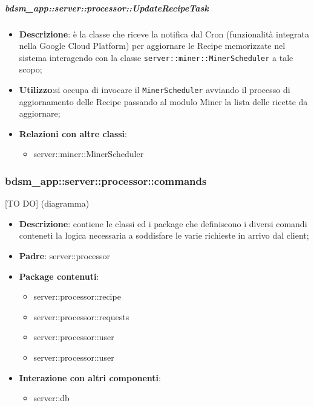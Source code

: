     \subparagraph{bdsm\_app::server::processor::UpdateRecipeTask} %
    \label{subp:bdsm_app_server_processor_updaterecipetask}
    \begin{itemize}
      \item \textbf{Descrizione}: è la classe che riceve la notifica dal Cron (funzionalità integrata nella Google Cloud Platform) per aggiornare le Recipe memorizzate nel sistema interagendo con la classe \texttt{server::miner::MinerScheduler} a tale scopo;
      \item \textbf{Utilizzo}:si occupa di invocare il \texttt{MinerScheduler} avviando il processo di aggiornamento delle Recipe passando al modulo Miner la lista delle ricette da aggiornare;
      \item \textbf{Relazioni con altre classi}:
        \begin{itemize}
          \item server::miner::MinerScheduler
        \end{itemize}
    \end{itemize}


    \subsubsection{bdsm\_app::server::processor::commands} %
    \label{ssub:bdsm_app_server_processor_commands}
    [TO DO] (diagramma) \newline \newline

    \begin{itemize}
      \item \textbf{Descrizione}: contiene le classi ed i package che definiscono i diversi comandi conteneti la logica necessaria a soddisfare le varie richieste in arrivo dal client;
      \item \textbf{Padre}: server::processor
      \item \textbf{Package contenuti}:
        \begin{itemize}
          \item server::processor::recipe
          \item server::processor::requests
          \item server::processor::user
          \item server::processor::user
        \end{itemize}
      \item \textbf{Interazione con altri componenti}:
        \begin{itemize}
          \item server::db
        \end{itemize}
    \end{itemize}


